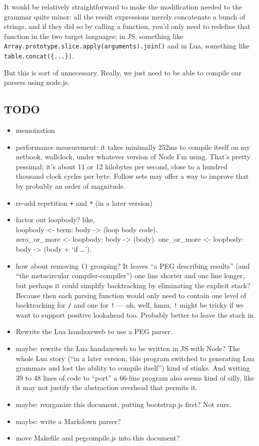 \documentclass[
]{article}
\providecommand{\tightlist}{%
  \setlength{\itemsep}{0pt}\setlength{\parskip}{0pt}}
\begin{document}
It would be relatively straightforward to make the modification needed
to the grammar quite minor: all the result expressions merely
concatenate a bunch of strings, and if they did so by calling a
function, you'd only need to redefine that function in the two target
languages; in JS, something like
\texttt{Array.prototype.slice.apply(arguments).join(\textquotesingle{}\textquotesingle{})}
and in Lua, something like \texttt{table.concat(\{...\})}.

But this is sort of unnecessary. Really, we just need to be able to
compile our parsers using node.js.

\hypertarget{todo}{%
\subsection{TODO}\label{todo}}

\begin{itemize}
\tightlist
\item
  memoization
\item
  performance measurement: it takes minimally 252ms to compile itself on
  my netbook, wallclock, under whatever version of Node I'm using.
  That's pretty pessimal; it's about 11 or 12 kilobytes per second,
  close to a hundred thousand clock cycles per byte. Follow sets may
  offer a way to improve that by probably an order of magnitude.
\item
  re-add repetition \texttt{+} and \texttt{*} (in a later version)
\item
  factor out loopbody? like,\\
  loopbody \textless- term: body -\textgreater{} (loop body code).\\
  zero\_or\_more \textless- loopbody: body -\textgreater{} (body).
  one\_or\_more \textless- loopbody: body -\textgreater{} (body + `if
  \ldots{}').
\item
  how about removing \texttt{()} grouping? It leaves ``a PEG describing
  results'' (and ``the metacircular compiler-compiler'') one line
  shorter and one line longer, but perhaps it could simplify
  backtracking by eliminating the explicit stack? Because then each
  parsing function would only need to contain one level of backtracking
  for \texttt{/} and one for \texttt{!} --- oh, well, hmm, \texttt{!}
  might be tricky if we want to support positive lookahead too. Probably
  better to leave the stack in.
\item
  Rewrite the Lua handaxeweb to use a PEG parser.
\item
  maybe: rewrite the Lua handaxeweb to be written in JS with Node? The
  whole Lua story (``in a later version, this program switched to
  generating Lua grammars and lost the ability to compile itself'') kind
  of stinks. And writing 39 to 48 lines of code to ``port'' a 66-line
  program also seems kind of silly, like it may not justify the
  abstraction overhead that permits it.
\item
  maybe: reorganize this document, putting bootstrap.js first? Not sure.
\item
  maybe: write a Markdown parser?
\item
  move Makefile and pegcompile.js into this document?
\end{itemize}
\end{document}
